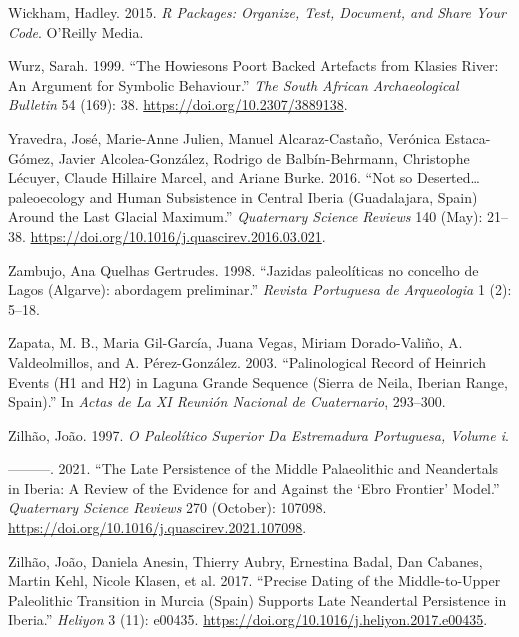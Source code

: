 \documentclass[
  a4paper,
  DIV=11,
  numbers=noendperiod]{scrreprt}
\newlength{\cslhangindent}
\newenvironment{CSLReferences}[2] %
 {\begin{list}{}{%
  \setlength{\itemindent}{0pt}
  \setlength{\leftmargin}{0pt}
  \setlength{\parsep}{0pt}
  \ifodd #1
   \setlength{\leftmargin}{\cslhangindent}
   \setlength{\itemindent}{-1\cslhangindent}
  \fi
  \setlength{\itemsep}{#2\baselineskip}}}
 {\end{list}}
\begin{document}
\begin{CSLReferences}{1}{0}
Wickham, Hadley. 2015. \emph{R {Packages}: {Organize}, {Test},
{Document}, and {Share Your Code}}. O'Reilly Media.

Wurz, Sarah. 1999. {``The Howiesons Poort Backed Artefacts from Klasies
River: An Argument for Symbolic Behaviour.''} \emph{The South African
Archaeological Bulletin} 54 (169): 38.
\url{https://doi.org/10.2307/3889138}.

Yravedra, José, Marie-Anne Julien, Manuel Alcaraz-Castaño, Verónica
Estaca-Gómez, Javier Alcolea-González, Rodrigo de Balbín-Behrmann,
Christophe Lécuyer, Claude Hillaire Marcel, and Ariane Burke. 2016.
{``Not so Deserted{\ldots{}}paleoecology and Human Subsistence in
{Central Iberia} ({Guadalajara}, {Spain}) Around the {Last Glacial
Maximum}.''} \emph{Quaternary Science Reviews} 140 (May): 21--38.
\url{https://doi.org/10.1016/j.quascirev.2016.03.021}.

Zambujo, Ana Quelhas Gertrudes. 1998. {``{Jazidas paleol{í}ticas no
concelho de Lagos (Algarve): abordagem preliminar}.''} \emph{Revista
Portuguesa de Arqueologia} 1 (2): 5--18.

Zapata, M. B., Maria Gil-García, Juana Vegas, Miriam Dorado-Valiño, A.
Valdeolmillos, and A. Pérez-González. 2003. {``Palinological Record of
Heinrich Events (H1 and H2) in Laguna Grande Sequence (Sierra de Neila,
Iberian Range, Spain).''} In \emph{Actas de La XI Reunión Nacional de
Cuaternario}, 293--300.

Zilhão, João. 1997. \emph{O Paleolítico Superior Da Estremadura
Portuguesa, Volume i}.

---------. 2021. {``The Late Persistence of the {Middle Palaeolithic}
and {Neandertals} in {Iberia}: {A} Review of the Evidence for and
Against the {`{Ebro Frontier}'} Model.''} \emph{Quaternary Science
Reviews} 270 (October): 107098.
\url{https://doi.org/10.1016/j.quascirev.2021.107098}.

Zilhão, João, Daniela Anesin, Thierry Aubry, Ernestina Badal, Dan
Cabanes, Martin Kehl, Nicole Klasen, et al. 2017. {``Precise Dating of
the {Middle-to-Upper Paleolithic} Transition in {Murcia} ({Spain})
Supports Late {Neandertal} Persistence in {Iberia}.''} \emph{Heliyon} 3
(11): e00435. \url{https://doi.org/10.1016/j.heliyon.2017.e00435}.

\end{CSLReferences}
\end{document}
